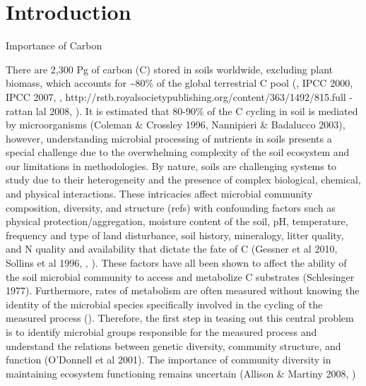 \section{Introduction} 
Importance of Carbon 

There are 2,300 Pg of carbon (C) stored in soils worldwide, excluding plant biomass, which accounts for \sim80\% of the global terrestrial C pool (\cite{Amundson_2001}, IPCC 2000, IPCC 2007, \cite{elsen_Ayres_Wall_Bardgett_2011}, http://rstb.royalsocietypublishing.org/content/363/1492/815.full - rattan lal 2008, \cite{BATJES_1996}). It is estimated that 80-90\% of the C cycling in soil is mediated by microorganisms (Coleman & Crossley 1996, Nannipieri & Badalucco 2003), however, understanding microbial processing of nutrients in soils presents a special challenge due to the overwhelming complexity of the soil ecosystem and our limitations in methodologies.  By nature, soils are challenging systems to study due to their heterogeneity and the presence of complex biological, chemical, and physical interactions.  These intricacies affect microbial community composition, diversity, and structure (refs) with confounding factors such as physical protection/aggregation, moisture content of the soil, pH, temperature, frequency and type of land disturbance, soil history, mineralogy, litter quality, and N quality and availability that dictate the fate of C (Gessner et al 2010, Sollins et al 1996, \cite{Torn_Vitousek_Trumbore_2005},  \cite{TRUMBORE_2006}). These factors have all been shown to affect the ability of the soil microbial community to access and metabolize C substrates (Schlesinger 1977). Furthermore, rates of metabolism are often measured without knowing the identity of the microbial species specifically involved in the cycling of the measured process (\cite{ndi_Pietramellara_Renella_2003}).  Therefore, the first step in teasing out this central problem is to identify microbial groups responsible for the measured process and understand the relations between genetic diversity, community structure, and function (O’Donnell et al 2001).  The importance of community diversity in maintaining ecosystem functioning remains uncertain (Allison & Martiny 2008, \cite{ndi_Pietramellara_Renella_2003})


